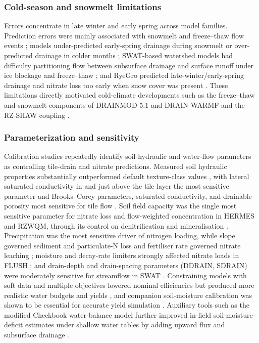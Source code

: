 \documentclass[11pt]{article}
\begin{document}
\subsubsection{Cold-season and snowmelt limitations}

Errors concentrate in late winter and early spring across model families. Prediction errors were mainly associated with snowmelt and freeze--thaw flow events \parencite{Luo2010}; models under-predicted early-spring drainage during snowmelt or over-predicted drainage in colder months \parencite{Nangia2008,Yang2007}; SWAT-based watershed models had difficulty partitioning flow between subsurface drainage and surface runoff under ice blockage and freeze--thaw \parencite{Nangia2010}; and RyeGro predicted late-winter/early-spring drainage and nitrate loss too early when snow cover was present \parencite{Feyereisen2007}. These limitations directly motivated cold-climate developments such as the freeze--thaw and snowmelt components of DRAINMOD 5.1 and DRAIN-WARMF and the RZ-SHAW coupling \parencite{Wang2006c,Dayyani2010b,Dayyani2010,Li2024b}.

\subsubsection{Parameterization and sensitivity}

Calibration studies repeatedly identify soil-hydraulic and water-flow parameters as controlling tile-drain and nitrate predictions. Measured soil hydraulic properties substantially outperformed default texture-class values \parencite{Ma2007c,Ahuja2007}, with lateral saturated conductivity in and just above the tile layer the most sensitive parameter \parencite{Ma2007c} and Brooks--Corey parameters, saturated conductivity, and drainable porosity most sensitive for tile flow \parencite{Ahmed2007}. Soil field capacity was the single most sensitive parameter for nitrate loss and flow-weighted concentration in HERMES and RZWQM, through its control on denitrification and mineralisation \parencite{Malone2017,Gillette2018}. Precipitation was the most sensitive driver of nitrogen loading, while slope governed sediment and particulate-N loss and fertiliser rate governed nitrate leaching \parencite{Deng2011}; moisture and decay-rate limiters strongly affected nitrate loads in FLUSH \parencite{Salo2015}; and drain-depth and drain-spacing parameters (DDRAIN, SDRAIN) were moderately sensitive for streamflow in SWAT \parencite{Moriasi2012}. Constraining models with soft data and multiple objectives lowered nominal efficiencies but produced more realistic water budgets and yields \parencite{Nelson2018}, and companion soil-moisture calibration was shown to be essential for accurate yield simulation \parencite{Wang2016}. Auxiliary tools such as the modified Checkbook water-balance model further improved in-field soil-moisture-deficit estimates under shallow water tables by adding upward flux and subsurface drainage \parencite{Kolars2019}.
\end{document}
